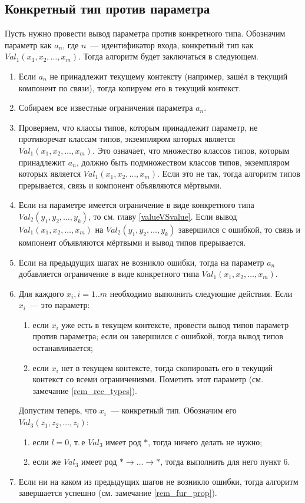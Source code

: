 \subsection{Конкретный тип против параметра}
Пусть нужно провести вывод параметра против конкретного типа. Обозначим параметр как $a_n$, где $n$~--- идентификатор входа, конкретный тип как $Val_1(x_1, x_2, \ldots, x_m)$. Тогда алгоритм будет заключаться в следующем.
\begin{enumerate}
	\item Если $a_n$ не принадлежит текущему контексту (например, зашёл в текущий компонент по связи), тогда копируем его в текущий контекст.
	\item Собираем все известные ограничения параметра $a_n$.
	\item Проверяем, что классы типов, которым принадлежит параметр, не противоречат классам типов, экземпляром которых является $Val_1(x_1, x_2, \ldots, x_m)$. Это означает, что множество классов типов, которым принадлежит $a_n$, должно быть подмножеством классов типов, экземпляром которых является $Val_1(x_1, x_2, \ldots, x_m)$. Если это не так, тогда алгоритм типов прерывается, связь и компонент объявляются мёртвыми.
	\item Если на параметре имеется ограничение в виде конкретного типа $Val_2(y_1, y_2, \ldots, y_k)$, то см. главу \ref{valueVSvalue}. Если вывод $Val_1(x_1, x_2, \ldots, x_m)$ на $Val_2(y_1, y_2, \ldots, y_k)$ завершился с ошибкой, то связь и компонент объявляются мёртвыми и вывод типов прерывается.
	\item Если на предыдущих шагах не возникло ошибки, тогда на параметр $a_n$ добавляется ограничение в виде конкретного типа $Val_1(x_1, x_2, \ldots, x_m)$.
	\item Для каждого $x_i, i = 1 .. m$ необходимо выполнить следующие действия. Если $x_i$~--- это параметр:
		\begin{enumerate}[1)]
			\item если $x_i$ уже есть в текущем контексте, провести вывод типов параметр против параметра; если он завершился с ошибкой, тогда вывод типов останавливается;
			\item если $x_i$ нет в текущем контексте, тогда скопировать его в текущий контекст со всеми ограничениями. Пометить этот параметр (см. замечание \ref{rem_rec_types}).
		\end{enumerate}	
	Допустим теперь, что $x_i$~--- конкретный тип. Обозначим его $Val_3(z_1, z_2, \ldots, z_l)$:
		\begin{enumerate}[1)]
			\item если $l = 0$, т.\,е $Val_3$ имеет род $*$, тогда ничего делать не нужно;
			\item если же $Val_3$ имеет род $* \rightarrow \ldots \rightarrow *$, тогда выполнить для него пункт 6.
		\end{enumerate}
	\item Если ни на каком из предыдущих шагов не возникло ошибки, тогда алгоритм завершается успешно (см. замечание \ref{rem_fur_prop}).
\end{enumerate}


